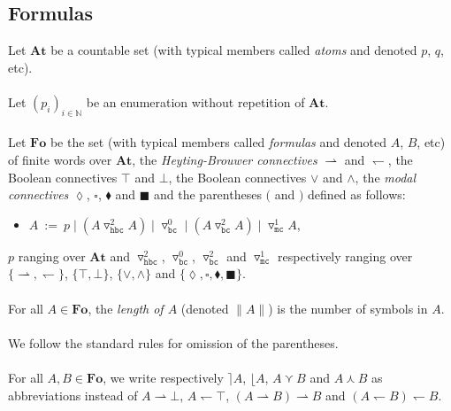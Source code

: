 \documentclass[draft]{article}
\def\N{\mathbb{N}}
\def\Fo{\mathbf{Fo}}
\def\At{\mathbf{At}}
\begin{document}
\subsection{Formulas}
%
%
Let $\At$ be a countable set (with typical members called {\em atoms}\/ and denoted $p$, $q$, etc).
%
%
\\
\\
%
%
Let $(p_{i})_{i{\in}\N}$ be an enumeration without repetition of $\At$.
%
%
\\
\\
%
%
Let $\Fo$ be the set (with typical members called {\em formulas}\/ and denoted $A$, $B$, etc) of finite words over $\At$, the {\em Heyting-Brouwer connectives}\/ ${\rightharpoonup}$ and ${\leftharpoondown}$, the Boolean connectives ${\top}$ and ${\bot}$, the Boolean connectives ${\vee}$ and ${\wedge}$, the {\em modal connectives}\/ ${\lozenge}$, ${\square}$, ${\blacklozenge}$ and $\blacksquare$ and the parentheses $($ and $)$ defined as follows:
%
%
\begin{itemize}
%
%
\item $A\ {:=}\ p{\mid}(A{\triangledown_{\mathtt{hbc}}^{2}}A){\mid}{\triangledown_{\mathtt{bc}}^{0}}{\mid}(A{\triangledown_{\mathtt{bc}}^{2}}A){\mid}{\triangledown_{\mathtt{mc}}^{1}}A$,
%
%
\end{itemize}
%
%
$p$ ranging over $\At$ and $\triangledown_{\mathtt{hbc}}^{2}$, $\triangledown_{\mathtt{bc}}^{0}$, $\triangledown_{\mathtt{bc}}^{2}$ and $\triangledown_{\mathtt{mc}}^{1}$ respectively ranging over $\{{\rightharpoonup},{\leftharpoondown}\}$, $\{{\top},{\bot}\}$, $\{{\vee},{\wedge}\}$ and $\{{\lozenge},{\square},{\blacklozenge},{\blacksquare}\}$.
%
%
\\
\\
%
%
For all $A{\in}\Fo$, the {\em length of $A$}\/ (denoted ${\parallel}A{\parallel}$) is the number of symbols in $A$.
%
%
\\
\\
%
%
We follow the standard rules for omission of the parentheses.
%
%
\\
\\
%
%
For all $A,B{\in}\Fo$, we write respectively ${\rceil}A$, ${\lfloor}A$, $A{\curlyvee}B$ and $A{\curlywedge}B$ as abbreviations instead of $A{\rightharpoonup}{\bot}$, $A{\leftharpoondown}{\top}$, $(A{\rightharpoonup}B){\rightharpoonup}B$ and $(A{\leftharpoondown}B){\leftharpoondown}B$.
\end{document}

